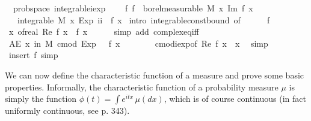 \documentclass{article}
\theoremstyle{definition}
\begin{document}
\begin{isabellebody}
\isamarkupfalse%
\ {\isacharparenleft}\ prob{\isacharunderscore}space{\isacharparenright}\ integrable{\isacharunderscore}iexp{\isacharcolon}\ \isanewline
\ \ \ f{\isacharcolon}\ {\isachardoublequoteopen}f\ {\isasymin}\ borel{\isacharunderscore}measurable\ M{\isachardoublequoteclose}\ {\isachardoublequoteopen}{\isasymAnd}x{\isachardot}\ Im\ {\isacharparenleft}f\ x{\isacharparenright}\ {\isacharequal}\ {}{\isachardoublequoteclose}\isanewline
\ \ \ {\isachardoublequoteopen}integrable\ M\ {\isacharparenleft}{\isasymlambda}x{\isachardot}\ Exp\ {\isacharparenleft}ii\ {\isacharasterisk}\ {\isacharparenleft}f\ x{\isacharparenright}{\isacharparenright}{\isacharparenright}{\isachardoublequoteclose}\isanewline
{}\isamarkupfalse%
\ {\isacharparenleft}intro\ integrable{\isacharunderscore}const{\isacharunderscore}bound\ {\isacharbrackleft}of\ {\isacharunderscore}\ {}{\isacharbrackright}{\isacharparenright}\isanewline
\ \ \isamarkupfalse%
\ f\ \isamarkupfalse%
\ {\isachardoublequoteopen}{\isasymAnd}x{\isachardot}\ of{\isacharunderscore}real\ {\isacharparenleft}Re\ {\isacharparenleft}f\ x{\isacharparenright}{\isacharparenright}\ {\isacharequal}\ f\ x{\isachardoublequoteclose}\isanewline
\ \ \ \ \isamarkupfalse%
\ {\isacharparenleft}simp\ add{\isacharcolon}\ complex{\isacharunderscore}eq{\isacharunderscore}iff{\isacharparenright}\isanewline
\ \ \isamarkupfalse%
\ \isamarkupfalse%
\ {\isachardoublequoteopen}AE\ x\ in\ M{\isachardot}\ cmod\ {\isacharparenleft}Exp\ {\isacharparenleft}{\isasymi}\ {\isacharasterisk}\ f\ x{\isacharparenright}{\isacharparenright}\ {\isasymle}\ {}{\isachardoublequoteclose}\isanewline
\ \ \ \ \isamarkupfalse%
\ cmod{\isacharunderscore}iexp{\isacharbrackleft}of\ {\isachardoublequoteopen}Re\ {\isacharparenleft}f\ x{\isacharparenright}{\isachardoublequoteclose}\ \ x{\isacharbrackright}\ \isamarkupfalse%
\ simp\isanewline
{}\isamarkupfalse%
\ {\isacharparenleft}insert\ f{\isacharcomma}\ simp{\isacharparenright}%
\end{isabellebody}

\medskip

We can now define the characteristic function of a measure and prove some basic properties. Informally, the characteristic function of a probability measure $\mu$ is simply the function $\phi(t) = \int e^{itx} \, \mu(dx)$, which is of course continuous (in fact uniformly continuous, see \cite{billingsley} p. 343).
\end{document}
